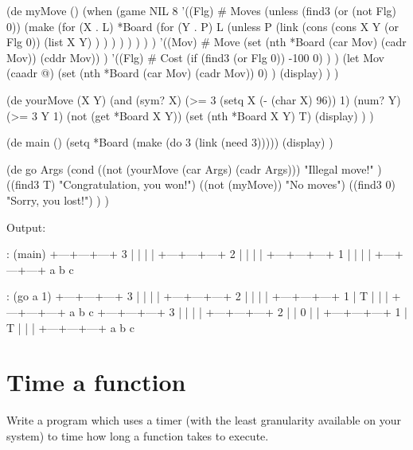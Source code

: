 \begin{wideverbatim}


(de myMove ()
   (when
      (game NIL 8
         '((Flg)     # Moves
            (unless (find3 (or (not Flg) 0))
               (make
                  (for (X . L) *Board
                     (for (Y . P) L
                        (unless P
                           (link
                              (cons
                                 (cons X Y (or Flg 0))
                                 (list X Y) ) ) ) ) ) ) ) )
         '((Mov) # Move
            (set (nth *Board (car Mov) (cadr Mov)) (cddr Mov)) )
         '((Flg)     # Cost
            (if (find3 (or Flg 0)) -100 0) ) )
      (let Mov (caadr @)
         (set (nth *Board (car Mov) (cadr Mov)) 0) )
      (display) ) )
 
(de yourMove (X Y)
   (and
      (sym? X)
      (>= 3 (setq X (- (char X) 96)) 1)
      (num? Y)
      (>= 3 Y 1)
      (not (get *Board X Y))
      (set (nth *Board X Y) T)
      (display) ) )
 
(de main ()
   (setq *Board (make (do 3 (link (need 3)))))
   (display) )
 
(de go Args
   (cond
      ((not (yourMove (car Args) (cadr Args)))
         "Illegal move!" )
      ((find3 T) "Congratulation, you won!")
      ((not (myMove)) "No moves")
      ((find3 0) "Sorry, you lost!") ) )

\end{wideverbatim}

\begin{wideverbatim}


Output:

: (main)
   +---+---+---+
 3 |   |   |   |
   +---+---+---+
 2 |   |   |   |
   +---+---+---+
 1 |   |   |   |
   +---+---+---+
     a   b   c

: (go a 1)
   +---+---+---+
 3 |   |   |   |
   +---+---+---+
 2 |   |   |   |
   +---+---+---+
 1 | T |   |   |
   +---+---+---+
     a   b   c
   +---+---+---+
 3 |   |   |   |
   +---+---+---+
 2 |   | 0 |   |
   +---+---+---+
 1 | T |   |   |
   +---+---+---+
     a   b   c

\end{wideverbatim}

\pagebreak{}
\section*{Time a function}

Write a program which uses a timer (with the least granularity available
on your system) to time how long a function takes to execute.

